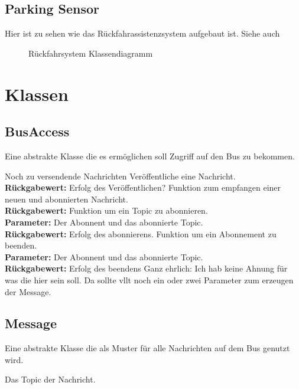 \documentclass[entwurf.tex]{subfiles}
\begin{document}
  		
  		
  	\newpage
  	\section{Parking Sensor}
		Hier ist zu sehen wie das Rückfahrassistenzsystem aufgebaut ist. Siehe auch %
		\begin{figure}[H]
  			\caption{Rückfahrsystem Klassendiagramm}
  		\end{figure}
  	
  	
\chapter{Klassen}
	\section{BusAccess}
	\label{Class:BusAccess}
		Eine abstrakte Klasse die es ermöglichen soll Zugriff auf den Bus zu bekommen.
		\begin{description}
				Noch zu versendende Nachrichten
				Veröffentliche eine Nachricht.\\ 
				\textbf{Rückgabewert:} Erfolg des Veröffentlichen?
				Funktion zum empfangen einer neuen und abonnierten Nachricht.\\ 
				\textbf{Rückgabewert:}
				Funktion um ein Topic zu abonnieren.\\ 
				\textbf{Parameter:} Der Abonnent und das abonnierte Topic.\\ 
				\textbf{Rückgabewert:} Erfolg des abonnierens.
				Funktion um ein Abonnement zu beenden.\\ 
				\textbf{Parameter:} Der Abonnent und das abonnierte Topic.\\ 
				\textbf{Rückgabewert:} Erfolg des beendens
				Ganz ehrlich: Ich hab keine Ahnung für was die hier sein soll. Da sollte vllt noch ein oder zwei Parameter zum erzeugen der Message.
		\end{description}
  		
	\section{Message}
	\label{Class:Message}
		Eine abstrakte Klasse die als Muster für alle Nachrichten auf dem Bus genutzt wird.
		\begin{description}
			\attr{protected topic: Topic} 
				Das Topic der Nachricht.
		\end{description}
		

  	
\end{document}
